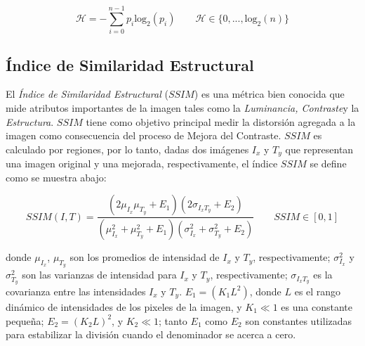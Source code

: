 \begin{equation}
\mathscr{H}= -\sum_{i=0}^{n-1} p_i \text{log}_2(p_i) \qquad \mathscr{H} \in \{0,...,\text{log}_2(n)\}
\end{equation}

\subsection{Índice de Similaridad Estructural}

El \textit{Índice de Similaridad Estructural} ($SSIM$) \cite{wang2004image} es una métrica bien conocida que mide atributos importantes de la imagen tales como la \textit{Luminancia, Contraste}y la \textit{Estructura}. $SSIM$ tiene como objetivo principal medir la distorsión agregada a la imagen como consecuencia del proceso de Mejora del Contraste. $SSIM$ es calculado por regiones, por lo tanto, dadas dos imágenes $I_x$ y $T_y$ que representan una imagen original y una mejorada, respectivamente, el índice $SSIM$ se define como se muestra abajo: 


\begin{equation}
SSIM(I,T) = \frac{(2\mu_{I_x} \mu_{T_y}+E_1)(2\sigma_{I_xT_y}+E_2)}{(\mu^2_{I_x}+\mu^2_{T_y}+E_1)(\sigma^2_{I_x} + \sigma^2_{T_y}+E_2)} \qquad SSIM \in [0,1]
\end{equation}

donde $\mu_{I_x}$, $\mu_{T_y}$ son los promedios de intensidad de $I_x$ y $T_y$, respectivamente; $\sigma^2_{I_x}$ y $\sigma^2_{T_y}$ son las varianzas de intensidad para $I_x$ y $T_y$, respectivamente; $\sigma_{I_xT_y}$ es la covarianza entre las intensidades $I_x$ y $T_y$. $E_1=(K_1L^2)$, donde $L$ es el rango dinámico de intensidades de los pixeles de la imagen, y $K_1 \ll 1$ es una constante pequeña; $E_2=(K_2L)^2$, y $K_2 \ll 1$; tanto $E_1$ como $E_2$ son constantes utilizadas para estabilizar la división cuando el denominador se acerca a cero.



